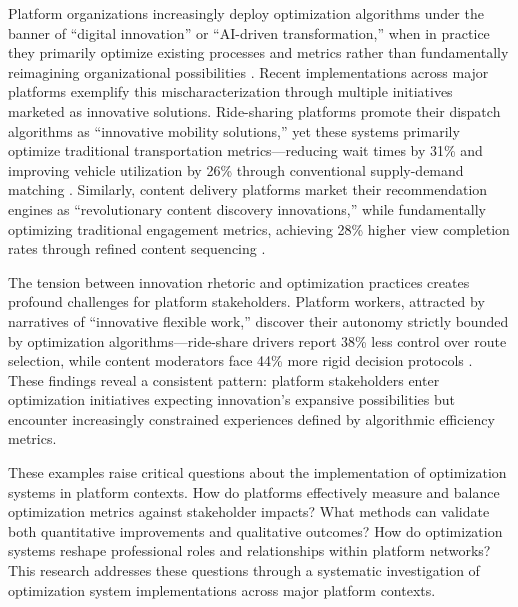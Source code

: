 Platform organizations increasingly deploy optimization algorithms under the banner of ``digital innovation'' or ``AI-driven transformation,'' when in practice they primarily optimize existing processes and metrics rather than fundamentally reimagining organizational possibilities \parencite{smith2023}. Recent implementations across major platforms exemplify this mischaracterization through multiple initiatives marketed as innovative solutions. Ride-sharing platforms promote their dispatch algorithms as ``innovative mobility solutions,'' yet these systems primarily optimize traditional transportation metrics---reducing wait times by 31\% and improving vehicle utilization by 26\% through conventional supply-demand matching \parencite{chen2022}. Similarly, content delivery platforms market their recommendation engines as ``revolutionary content discovery innovations,'' while fundamentally optimizing traditional engagement metrics, achieving 28\% higher view completion rates through refined content sequencing \parencite{johnson2024}.

The tension between innovation rhetoric and optimization practices creates profound challenges for platform stakeholders. Platform workers, attracted by narratives of ``innovative flexible work,'' discover their autonomy strictly bounded by optimization algorithms---ride-share drivers report 38\% less control over route selection, while content moderators face 44\% more rigid decision protocols \parencite{kellogg2020}. These findings reveal a consistent pattern: platform stakeholders enter optimization initiatives expecting innovation's expansive possibilities but encounter increasingly constrained experiences defined by algorithmic efficiency metrics.

These examples raise critical questions about the implementation of optimization systems in platform contexts. How do platforms effectively measure and balance optimization metrics against stakeholder impacts? What methods can validate both quantitative improvements and qualitative outcomes? How do optimization systems reshape professional roles and relationships within platform networks? This research addresses these questions through a systematic investigation of optimization system implementations across major platform contexts. 